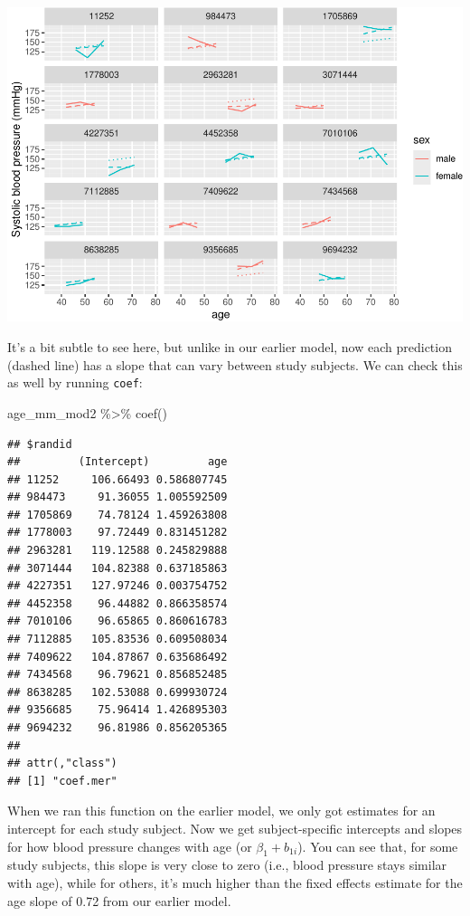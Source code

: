 \documentclass[
]{book}
\newenvironment{Shaded}{\begin{snugshade}}{\end{snugshade}}
\newcommand{\FunctionTok}[1]{\textcolor[rgb]{0.00,0.00,0.00}{#1}}
\newcommand{\NormalTok}[1]{#1}
\newcommand{\SpecialCharTok}[1]{\textcolor[rgb]{0.00,0.00,0.00}{#1}}
\begin{document}
\includegraphics{adv_epi_analysis_files/figure-latex/unnamed-chunk-305-1.pdf}

It's a bit subtle to see here, but unlike in our earlier model, now each
prediction (dashed line) has a slope that can vary between study subjects.
We can check this as well by running \texttt{coef}:

\begin{Shaded}
\begin{Highlighting}[]
\NormalTok{age\_mm\_mod2 }\SpecialCharTok{\%\textgreater{}\%} 
  \FunctionTok{coef}\NormalTok{()}
\end{Highlighting}
\end{Shaded}

\begin{verbatim}
## $randid
##         (Intercept)         age
## 11252     106.66493 0.586807745
## 984473     91.36055 1.005592509
## 1705869    74.78124 1.459263808
## 1778003    97.72449 0.831451282
## 2963281   119.12588 0.245829888
## 3071444   104.82388 0.637185863
## 4227351   127.97246 0.003754752
## 4452358    96.44882 0.866358574
## 7010106    96.65865 0.860616783
## 7112885   105.83536 0.609508034
## 7409622   104.87867 0.635686492
## 7434568    96.79621 0.856852485
## 8638285   102.53088 0.699930724
## 9356685    75.96414 1.426895303
## 9694232    96.81986 0.856205365
## 
## attr(,"class")
## [1] "coef.mer"
\end{verbatim}

When we ran this function on the earlier model, we only got estimates for an
intercept for each study subject. Now we get subject-specific intercepts and
slopes for how blood pressure changes with age (or \(\beta_{1} + b_{1i}\)). You
can see that, for some study subjects, this slope is very close to zero (i.e.,
blood pressure stays similar with age), while for others, it's much higher than
the fixed effects estimate for the age slope of 0.72 from our earlier model.
\end{document}
